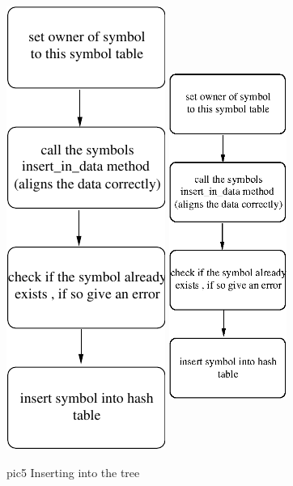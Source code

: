 \documentclass [12pt]{article}
\begin{document}
\begin{figure}
\ifpdf
\includegraphics{arch5.pdf}
\else
\includegraphics[width=1.51in,height=5.51in]{arch5.eps}
\fi
\label{fig5}
\caption{pic5 Inserting into the tree}
\end{figure}
\end{document}

